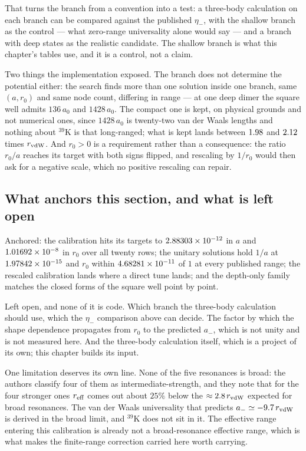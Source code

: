 \documentclass[11pt,a4paper]{article}
\begin{document}
That turns the branch from a convention into a test: a three-body calculation
on each branch can be compared against the published $\eta_-$, with the
shallow branch as the control --- what zero-range universality alone would say
--- and a branch with deep states as the realistic candidate. The shallow
branch is what this chapter's tables use, and it is a control, not a claim.

Two things the implementation exposed. The branch does not determine the
potential either: the search finds more than one solution inside one branch,
same $(a,r_0)$ and same node count, differing in range --- at one deep dimer
the square well admits $136\,a_0$ and $1428\,a_0$. The compact one is kept, on
physical grounds and not numerical ones, since $1428\,a_0$ is twenty-two van
der Waals lengths and nothing about $^{39}$K is that long-ranged; what is kept
lands between $1.98$ and $2.12$ times
$r_{\rm vdW}$. And $r_0>0$ is a requirement rather than a consequence: the
ratio $r_0/a$ reaches its target with both signs flipped, and rescaling by
$1/r_0$ would then ask for a negative scale, which no positive rescaling can
repair.

\subsection{What anchors this section, and what is left open}

Anchored: the calibration hits its targets to $2.88303 \times 10^{-12}$ in $a$ and
$1.01692 \times 10^{-8}$ in $r_0$ over all twenty rows; the unitary solutions hold
$1/a$ at $1.97842 \times 10^{-15}$ and $r_0$ within $4.68281 \times 10^{-11}$ of $1$ at every
published range; the rescaled calibration lands where a direct tune lands; and
the depth-only family matches the closed forms of the square well point by
point.

Left open, and none of it is code. Which branch the three-body calculation
should use, which the $\eta_-$ comparison above can decide. The factor by
which the shape dependence propagates from $r_0$ to the predicted $a_-$, which
is not unity and is not measured here. And the three-body calculation itself,
which is a project of its own; this chapter builds its input.

One limitation deserves its own line. None of the five resonances is broad:
the authors classify four of them as intermediate-strength, and they note that
for the four stronger ones $r_{\rm eff}$ comes out about $25\%$ below the
$\approx2.8\,r_{\rm vdW}$ expected for broad resonances. The van der Waals
universality that predicts $a_-\simeq-9.7\,r_{\rm vdW}$ is derived in the
broad limit, and $^{39}$K does not sit in it. The effective range entering
this calibration is already not a broad-resonance effective range, which is
what makes the finite-range correction carried here worth carrying.
\end{document}
